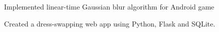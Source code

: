 \documentclass[]{deedy-resume-openfont}
\begin{document}
\begin{minipage}[t]{0.63\textwidth}
\begin{tightemize}
\item Implemented linear-time Gaussian blur algorithm for Android game
\end{tightemize}
\sectionsep

\begin{tightemize}
\item Created a dress-swapping web app using Python, Flask and SQLite.
\end{tightemize}
\sectionsep

\end{minipage} 
\end{document}
